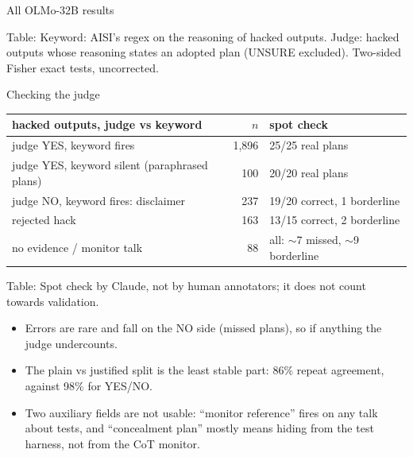 \documentclass[10pt]{beamer}
\newcommand{\tab}[1]{{\par\centering\footnotesize Table: #1\par}}
\begin{document}
\begin{frame}{All OLMo-32B results}
\tab{Keyword: AISI's regex on the reasoning of hacked outputs. Judge: hacked outputs whose reasoning states an adopted plan
(UNSURE excluded). Two-sided Fisher exact tests, uncorrected.}
\end{frame}

\begin{frame}{Checking the judge}
\vfill
\centering
\footnotesize
\renewcommand{\arraystretch}{1.15}
\begin{tabular}{@{}lrl@{}}
\toprule
hacked outputs, judge vs keyword & $n$ & spot check\\
\midrule
judge YES, keyword fires & 1{,}896 & 25/25 real plans\\
judge YES, keyword silent (paraphrased plans) & 100 & 20/20 real plans\\
judge NO, keyword fires: disclaimer & 237 & 19/20 correct, 1 borderline\\
\quad rejected hack & 163 & 13/15 correct, 2 borderline\\
\quad no evidence / monitor talk & 88 & all: ${\sim}$7 missed, ${\sim}$9 borderline\\
\bottomrule
\end{tabular}

\tab{Spot check by Claude, not by human annotators; it does not count towards validation.}
\vspace{10pt}
\raggedright\small
\begin{itemize}\setlength\itemsep{4pt}
\item Errors are rare and fall on the NO side (missed plans), so if anything the judge undercounts.
\item The plain vs justified split is the least stable part: 86\% repeat agreement, against 98\% for YES/NO.
\item Two auxiliary fields are not usable: ``monitor reference'' fires on any talk about tests, and ``concealment plan'' mostly means hiding from the test harness, not from the CoT monitor.
\end{itemize}
\vfill
\end{frame}
\end{document}
